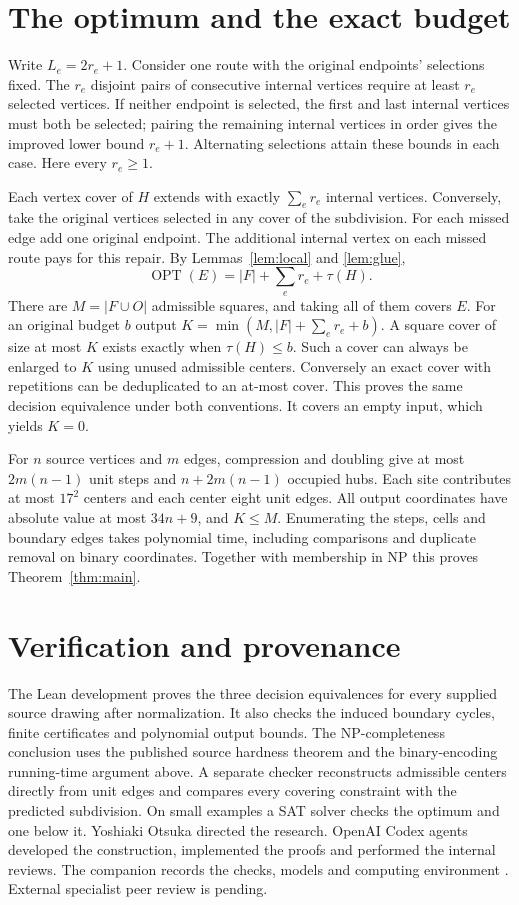 \documentclass[11pt]{article}
\newcommand{\OPT}{\operatorname{OPT}}
\begin{document}
\section{The optimum and the exact budget}
Write \(L_e=2r_e+1\). Consider one route with the original endpoints' selections fixed. The \(r_e\) disjoint pairs of consecutive internal vertices require at least \(r_e\) selected vertices. If neither endpoint is selected, the first and last internal vertices must both be selected; pairing the remaining internal vertices in order gives the improved lower bound \(r_e+1\). Alternating selections attain these bounds in each case. Here every \(r_e\ge1\).

Each vertex cover of \(H\) extends with exactly \(\sum_e r_e\) internal vertices. Conversely, take the original vertices selected in any cover of the subdivision. For each missed edge add one original endpoint. The additional internal vertex on each missed route pays for this repair. By Lemmas~\ref{lem:local} and \ref{lem:glue},
\[
  \OPT(E)=|F|+\sum_e r_e+\tau(H).
\]
There are \(M=|F\cup O|\) admissible squares, and taking all of them covers \(E\). For an original budget \(b\) output \(K=\min(M,|F|+\sum_e r_e+b)\). A square cover of size at most \(K\) exists exactly when \(\tau(H)\le b\). Such a cover can always be enlarged to \(K\) using unused admissible centers. Conversely an exact cover with repetitions can be deduplicated to an at-most cover. This proves the same decision equivalence under both conventions. It covers an empty input, which yields \(K=0\).

For \(n\) source vertices and \(m\) edges, compression and doubling give at most \(2m(n-1)\) unit steps and \(n+2m(n-1)\) occupied hubs. Each site contributes at most \(17^2\) centers and each center eight unit edges. All output coordinates have absolute value at most \(34n+9\), and \(K\le M\). Enumerating the steps, cells and boundary edges takes polynomial time, including comparisons and duplicate removal on binary coordinates. Together with membership in NP this proves Theorem~\ref{thm:main}.

\section*{Verification and provenance}
The Lean development proves the three decision equivalences for every supplied source drawing after normalization. It also checks the induced boundary cycles, finite certificates and polynomial output bounds. The NP-completeness conclusion uses the published source hardness theorem \cite[Theorem 4.3]{bergren} and the binary-encoding running-time argument above. A separate checker reconstructs admissible centers directly from unit edges and compares every covering constraint with the predicted subdivision. On small examples a SAT solver checks the optimum and one below it. Yoshiaki Otsuka directed the research. OpenAI Codex agents developed the construction, implemented the proofs and performed the internal reviews. The companion records the checks, models and computing environment \cite{companion}. External specialist peer review is pending.
\end{document}
